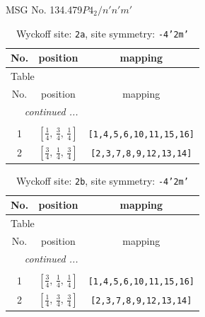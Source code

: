 \documentclass[fleqn,8pt]{jsarticle}
\begin{document}
\setcounter{MaxMatrixCols}{32}

\renewcommand{\tablename}{Table~}
\renewcommand{\figurename}{Figure~}
\begin{center}
\LARGE
MSG No. 134.479\quad$P4_{2}/n'n'm'$
\end{center}
\renewcommand{\arraystretch}{1.2}
\begin{longtable}{ccc}
\caption{Wyckoff site: {\tt 2a}, site symmetry: {\tt -4'2m'}}
 \\
 \hline \hline
No. & position & mapping \\ \hline \endfirsthead

\multicolumn{2}{l}{\tablename\ \thetable{}} \\
 \hline \hline
No. & position & mapping \\ \hline \endhead

 \hline \hline
\multicolumn{2}{r}{\footnotesize\it continued ...} \\ \endfoot

 \hline \hline
\multicolumn{2}{r}{} \\ \endlastfoot

1 & $\left[ \frac{1}{4},\, \frac{3}{4},\, \frac{1}{4} \right]$ & {\tt [1,4,5,6,10,11,15,16]} \\ \hline
2 & $\left[ \frac{3}{4},\, \frac{1}{4},\, \frac{3}{4} \right]$ & {\tt [2,3,7,8,9,12,13,14]} \\
\end{longtable}
\renewcommand{\arraystretch}{1.2}
\begin{longtable}{ccc}
\caption{Wyckoff site: {\tt 2b}, site symmetry: {\tt -4'2m'}}
 \\
 \hline \hline
No. & position & mapping \\ \hline \endfirsthead

\multicolumn{2}{l}{\tablename\ \thetable{}} \\
 \hline \hline
No. & position & mapping \\ \hline \endhead

 \hline \hline
\multicolumn{2}{r}{\footnotesize\it continued ...} \\ \endfoot

 \hline \hline
\multicolumn{2}{r}{} \\ \endlastfoot

1 & $\left[ \frac{3}{4},\, \frac{1}{4},\, \frac{1}{4} \right]$ & {\tt [1,4,5,6,10,11,15,16]} \\ \hline
2 & $\left[ \frac{1}{4},\, \frac{3}{4},\, \frac{3}{4} \right]$ & {\tt [2,3,7,8,9,12,13,14]} \\
\end{longtable}
\end{document}
